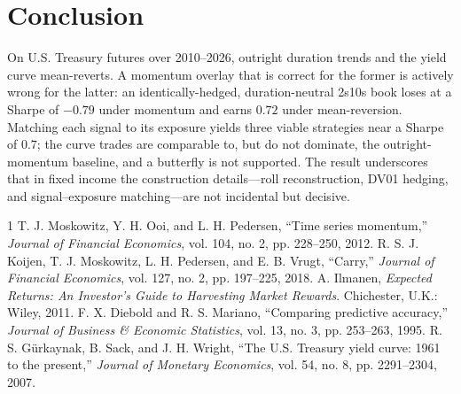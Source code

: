 \documentclass[conference]{IEEEtran}
\begin{document}
\section{Conclusion}
On U.S. Treasury futures over 2010--2026, outright duration trends and the yield
curve mean-reverts. A momentum overlay that is correct for the former is
actively wrong for the latter: an identically-hedged, duration-neutral 2s10s
book loses at a Sharpe of $-0.79$ under momentum and earns $0.72$ under
mean-reversion. Matching each signal to its exposure yields three viable
strategies near a Sharpe of $0.7$; the curve trades are comparable to, but do
not dominate, the outright-momentum baseline, and a butterfly is not supported.
The result underscores that in fixed income the construction details---roll
reconstruction, DV01 hedging, and signal--exposure matching---are not
incidental but decisive.

\begin{thebibliography}{1}
 T. J. Moskowitz, Y. H. Ooi, and L. H. Pedersen, ``Time series
momentum,'' \emph{Journal of Financial Economics}, vol. 104, no. 2,
pp. 228--250, 2012.
 R. S. J. Koijen, T. J. Moskowitz, L. H. Pedersen, and E. B.
Vrugt, ``Carry,'' \emph{Journal of Financial Economics}, vol. 127, no. 2,
pp. 197--225, 2018.
 A. Ilmanen, \emph{Expected Returns: An Investor's Guide to
Harvesting Market Rewards}. Chichester, U.K.: Wiley, 2011.
 F. X. Diebold and R. S. Mariano, ``Comparing predictive
accuracy,'' \emph{Journal of Business \& Economic Statistics}, vol. 13, no. 3,
pp. 253--263, 1995.
 R. S. G\"urkaynak, B. Sack, and J. H. Wright, ``The U.S. Treasury
yield curve: 1961 to the present,'' \emph{Journal of Monetary Economics},
vol. 54, no. 8, pp. 2291--2304, 2007.
\end{thebibliography}
\end{document}
